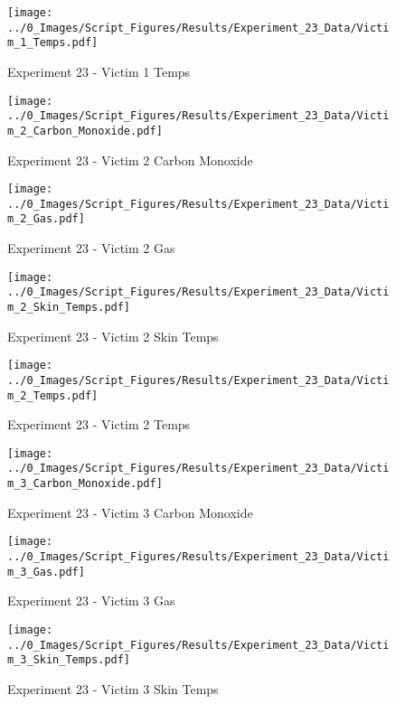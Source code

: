 	\clearpage

	\begin{figure}[H]
		\centering
		\texttt{[image: ../0\_Images/Script\_Figures/Results/Experiment\_23\_Data/Victim\_1\_Temps.pdf]}
		\caption[]{Experiment 23 - Victim 1 Temps}
	\end{figure}
 

	\begin{figure}[H]
		\centering
		\texttt{[image: ../0\_Images/Script\_Figures/Results/Experiment\_23\_Data/Victim\_2\_Carbon\_Monoxide.pdf]}
		\caption[]{Experiment 23 - Victim 2 Carbon Monoxide}
	\end{figure}
 
	\clearpage

	\begin{figure}[H]
		\centering
		\texttt{[image: ../0\_Images/Script\_Figures/Results/Experiment\_23\_Data/Victim\_2\_Gas.pdf]}
		\caption[]{Experiment 23 - Victim 2 Gas}
	\end{figure}
 

	\begin{figure}[H]
		\centering
		\texttt{[image: ../0\_Images/Script\_Figures/Results/Experiment\_23\_Data/Victim\_2\_Skin\_Temps.pdf]}
		\caption[]{Experiment 23 - Victim 2 Skin Temps}
	\end{figure}
 
	\clearpage

	\begin{figure}[H]
		\centering
		\texttt{[image: ../0\_Images/Script\_Figures/Results/Experiment\_23\_Data/Victim\_2\_Temps.pdf]}
		\caption[]{Experiment 23 - Victim 2 Temps}
	\end{figure}
 

	\begin{figure}[H]
		\centering
		\texttt{[image: ../0\_Images/Script\_Figures/Results/Experiment\_23\_Data/Victim\_3\_Carbon\_Monoxide.pdf]}
		\caption[]{Experiment 23 - Victim 3 Carbon Monoxide}
	\end{figure}
 
	\clearpage

	\begin{figure}[H]
		\centering
		\texttt{[image: ../0\_Images/Script\_Figures/Results/Experiment\_23\_Data/Victim\_3\_Gas.pdf]}
		\caption[]{Experiment 23 - Victim 3 Gas}
	\end{figure}
 

	\begin{figure}[H]
		\centering
		\texttt{[image: ../0\_Images/Script\_Figures/Results/Experiment\_23\_Data/Victim\_3\_Skin\_Temps.pdf]}
		\caption[]{Experiment 23 - Victim 3 Skin Temps}
	\end{figure}
 
